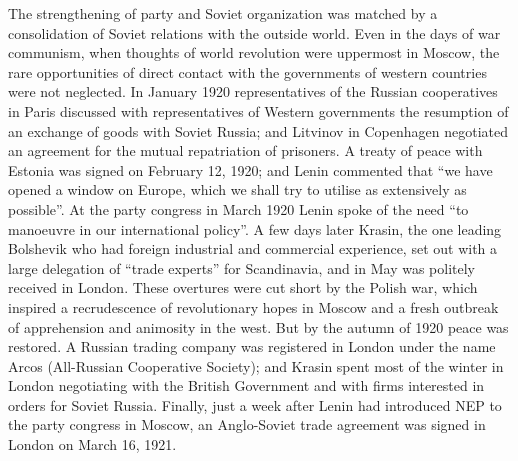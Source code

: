 The strengthening of party and Soviet organization was matched by a consolidation of Soviet relations with the outside world. Even in the days of war communism, when thoughts of world revolution were uppermost in Moscow, the rare opportunities of direct contact with the governments of western countries were not neglected. In January 1920 representatives of the Russian cooperatives in Paris discussed with representatives of Western governments the resumption of an exchange of goods with Soviet Russia; and Litvinov in Copenhagen negotiated an agreement for the mutual repatriation of prisoners. A treaty of peace with Estonia was signed on February 12, 1920; and Lenin commented that ``we have opened a window on Europe, which we shall try to utilise as extensively as possible''. At the party congress in March 1920 Lenin spoke of the need ``to manoeuvre in our international policy''. A few days later Krasin, the one leading Bolshevik who had foreign industrial and commercial experience, set out with a large delegation of ``trade experts'' for Scandinavia, and in May was politely received in London. These overtures were cut short by the Polish war, which inspired a recrudescence of revolutionary hopes in Moscow and a fresh outbreak of apprehension and animosity in the west. But by the autumn of 1920 peace was restored. A Russian trading company was registered in London under the name Arcos (All-Russian Cooperative Society); and Krasin spent most of the winter in London negotiating with the British Government and with firms interested in orders for Soviet Russia. Finally, just a week after Lenin had introduced NEP to the party congress in Moscow, an Anglo-Soviet trade agreement was signed in London on March 16, 1921. 

